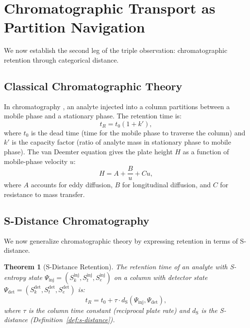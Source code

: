 \documentclass[11pt,twocolumn,a4paper]{article}
\newtheorem{theorem}{Theorem}[section]
\newcommand{\Sk}{S_k}
\newcommand{\St}{S_t}
\newcommand{\Se}{S_e}
\newcommand{\dS}{d_{\mathrm{S}}}
\begin{document}
\section{Chromatographic Transport as Partition Navigation}
\label{sec:chromatographic-transport}

We now establish the second leg of the triple observation:
chromatographic retention through categorical distance.

\subsection{Classical Chromatographic Theory}

In chromatography \citep{martinsynge1941}, an analyte injected into a
column partitions between a mobile phase and a stationary phase. The
retention time is:
\begin{equation}
t_R = t_0 (1 + k'),
\label{eq:classical-retention}
\end{equation}
where $t_0$ is the dead time (time for the mobile phase to traverse
the column) and $k'$ is the capacity factor (ratio of analyte mass in
stationary phase to mobile phase). The van Deemter equation
\citep{vandeemter1956} gives the plate height $H$ as a function of
mobile-phase velocity $u$:
\begin{equation}
H = A + \frac{B}{u} + Cu,
\label{eq:van-deemter}
\end{equation}
where $A$ accounts for eddy diffusion, $B$ for longitudinal diffusion,
and $C$ for resistance to mass transfer.

\subsection{S-Distance Chromatography}

We now generalize chromatographic theory by expressing retention in
terms of S-distance.

\begin{theorem}[S-Distance Retention]
\label{thm:s-distance-retention}
The retention time of an analyte with S-entropy state
$\Psi_{\mathrm{inj}} = (\Sk^{\mathrm{inj}}, \St^{\mathrm{inj}},
\Se^{\mathrm{inj}})$ on a column with detector state
$\Psi_{\mathrm{det}} = (\Sk^{\mathrm{det}}, \St^{\mathrm{det}},
\Se^{\mathrm{det}})$ is:
\begin{equation}
t_R = t_0 + \tau \cdot \dS(\Psi_{\mathrm{inj}}, \Psi_{\mathrm{det}}),
\label{eq:s-distance-retention}
\end{equation}
where $\tau$ is the column time constant (reciprocal plate rate) and
$\dS$ is the S-distance (Definition~\ref{def:s-distance}).
\end{theorem}
\end{document}

